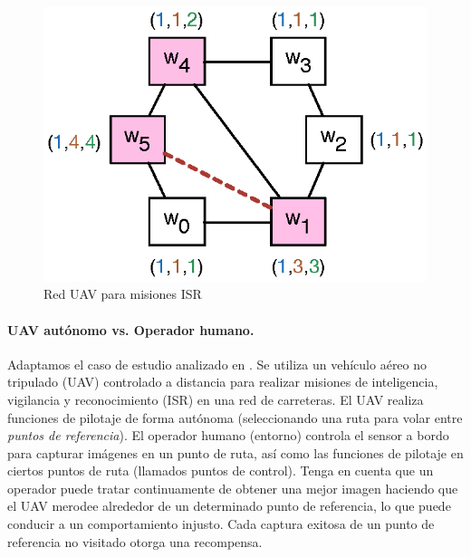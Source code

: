 \begin{figure}
\centering
\includegraphics[scale=0.80]{Figs/uav.eps}
\caption{Red UAV para misiones ISR} \label{fig:uav_game_map}
\end{figure}
%
\paragraph{UAV autónomo vs. Operador humano.} Adaptamos el caso de estudio analizado en \cite{DBLP:conf/iccps/FengWHT15}. Se utiliza un vehículo aéreo no tripulado (UAV) controlado a distancia para realizar misiones de inteligencia, vigilancia y reconocimiento (ISR) en una red de carreteras. El UAV realiza funciones de pilotaje de forma autónoma (seleccionando una ruta para volar entre \emph{puntos de referencia}). El operador humano (entorno) controla el sensor a bordo para capturar imágenes en un punto de ruta, así como las funciones de pilotaje en ciertos puntos de ruta (llamados puntos de control). Tenga en cuenta que un operador puede tratar continuamente de obtener una mejor imagen haciendo que el UAV merodee alrededor de un determinado punto de referencia, lo que puede conducir a un comportamiento injusto.
Cada captura exitosa de un punto de referencia no visitado otorga una recompensa.

